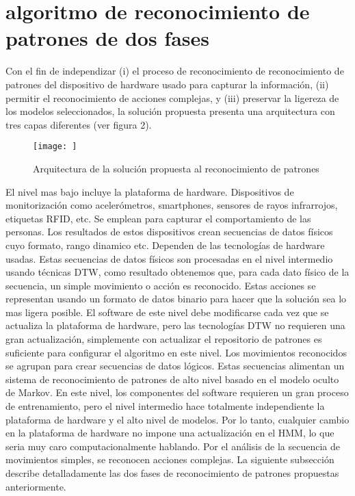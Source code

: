\documentclass[a4paper]{article}
\begin{document}
\section{algoritmo de reconocimiento de patrones de dos fases}
Con el fin de independizar (i) el proceso de reconocimiento de reconocimiento de patrones del dispositivo de hardware usado para capturar la información, (ii) permitir el reconocimiento de acciones complejas, y (iii) preservar la ligereza de los modelos seleccionados, la solución propuesta presenta una arquitectura con tres capas diferentes (ver figura 2).
\begin{figure}
    \centering
    \texttt{[image: ]}
    \caption{Arquitectura de la solución propuesta al reconocimiento de patrones}
    \label{fig:my_label}
\end{figure}
El nivel mas bajo incluye la plataforma de hardware. Dispositivos de monitorización como acelerómetros, smartphones, sensores de rayos infrarrojos, etiquetas RFID, etc. Se emplean para capturar el comportamiento de las personas. Los resultados de estos dispositivos crean secuencias de datos físicos cuyo formato, rango dinamico etc. Dependen de las tecnologías de hardware usadas.
Estas secuencias de datos físicos son procesadas en el nivel intermedio usando técnicas DTW, como resultado obtenemos que, para cada dato físico de la secuencia, un simple movimiento o acción es reconocido. Estas acciones se representan usando un formato de datos binario para hacer que la solución sea lo mas ligera posible. El software de este nivel debe modificarse cada vez que se actualiza la plataforma de hardware, pero las tecnologías DTW no requieren una gran actualización, simplemente con actualizar el repositorio de patrones es suficiente para configurar el algoritmo en este nivel.
Los movimientos reconocidos se agrupan para crear secuencias de datos lógicos. Estas secuencias alimentan un sistema de reconocimiento de patrones de alto nivel basado en el modelo oculto de Markov. En este nivel, los componentes del software requieren un gran proceso de entrenamiento, pero el nivel intermedio hace totalmente independiente la plataforma de hardware y el alto nivel de modelos. Por lo tanto, cualquier cambio en la plataforma de hardware no impone una actualización en el HMM, lo que seria muy caro computacionalmente hablando. Por el análisis de la secuencia de movimientos simples, se reconocen acciones complejas. La siguiente subsección describe detalladamente las dos fases de reconocimiento de patrones propuestas anteriormente. 
\end{document}
